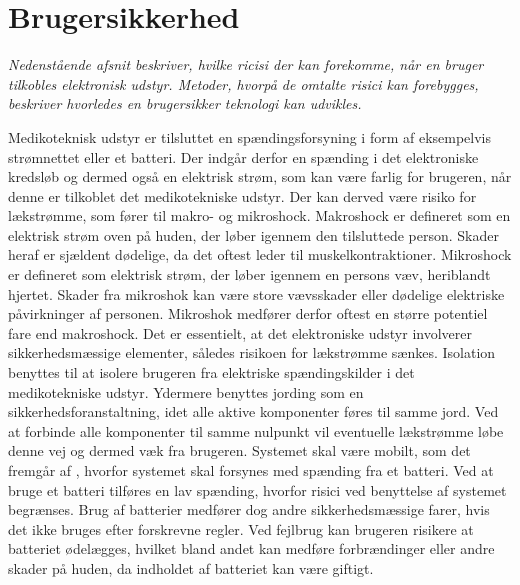 \section{Brugersikkerhed}
\textit{Nedenstående afsnit beskriver, hvilke ricisi der kan forekomme, når en bruger tilkobles elektronisk udstyr. Metoder, hvorpå de omtalte risici kan forebygges, beskriver hvorledes en brugersikker teknologi kan udvikles.}

Medikoteknisk udstyr er tilsluttet en spændingsforsyning i form af eksempelvis strømnettet eller et batteri. Der indgår derfor en spænding i det elektroniske kredsløb og dermed også en elektrisk strøm, som kan være farlig for brugeren, når denne er tilkoblet det medikotekniske udstyr. Der kan derved være risiko for lækstrømme, som fører til makro- og mikroshock. Makroshock er defineret som en elektrisk strøm oven på huden, der løber igennem den tilsluttede person. Skader heraf er sjældent dødelige, da det oftest leder til muskelkontraktioner. Mikroshock er defineret som elektrisk strøm, der løber igennem en persons væv, heriblandt hjertet. Skader fra mikroshok kan være store vævsskader eller dødelige elektriske påvirkninger af personen. Mikroshok medfører derfor oftest en større potentiel fare end makroshock. \citep{Webster2011} \newline
Det er essentielt, at det elektroniske udstyr involverer sikkerhedsmæssige elementer, således risikoen for lækstrømme sænkes. Isolation benyttes til at isolere brugeren fra elektriske spændingskilder i det medikotekniske udstyr. Ydermere benyttes jording som en sikkerhedsforanstaltning, idet alle aktive komponenter føres til samme jord. Ved at forbinde alle komponenter til samme nulpunkt vil eventuelle lækstrømme løbe denne vej og dermed væk fra brugeren. \citep{Webster2011} \newline 
Systemet skal være mobilt, som det fremgår af , hvorfor systemet skal forsynes med spænding fra et batteri. Ved at bruge et batteri tilføres en lav spænding, hvorfor risici ved benyttelse af systemet begrænses. Brug af batterier medfører dog andre sikkerhedsmæssige farer, hvis det ikke bruges efter forskrevne regler. Ved fejlbrug kan brugeren risikere at batteriet ødelægges, hvilket bland andet kan medføre forbrændinger eller andre skader på huden, da indholdet af batteriet kan være giftigt. 
%
